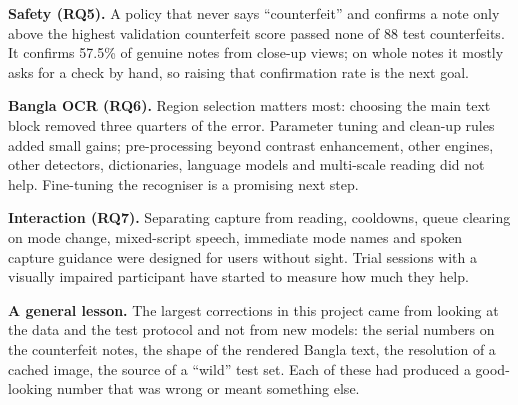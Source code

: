 \textbf{Safety (RQ5).} A policy that never says ``counterfeit'' and confirms a note only above the highest validation counterfeit score passed none of 88 test counterfeits. It confirms 57.5\% of genuine notes from close-up views; on whole notes it mostly asks for a check by hand, so raising that confirmation rate is the next goal.

\textbf{Bangla OCR (RQ6).} Region selection matters most: choosing the main text block removed three quarters of the error. Parameter tuning and clean-up rules added small gains; pre-processing beyond contrast enhancement, other engines, other detectors, dictionaries, language models and multi-scale reading did not help. Fine-tuning the recogniser is a promising next step.

\textbf{Interaction (RQ7).} Separating capture from reading, cooldowns, queue clearing on mode change, mixed-script speech, immediate mode names and spoken capture guidance were designed for users without sight. Trial sessions with a visually impaired participant have started to measure how much they help.

\textbf{A general lesson.} The largest corrections in this project came from looking at the data and the test protocol and not from new models: the serial numbers on the counterfeit notes, the shape of the rendered Bangla text, the resolution of a cached image, the source of a ``wild'' test set. Each of these had produced a good-looking number that was wrong or meant something else.

